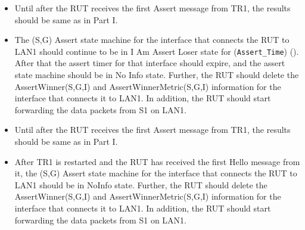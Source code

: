 \documentclass[11pt]{report}
\begin{document}

\begin{itemize}

  \item Until after the RUT receives the first Assert message from TR1, the
  results should be same as in Part I.

  \item The (S,G) Assert state machine for the interface that connects the RUT
  to LAN1 should continue to be in I Am Assert Loser state for
  (\verb=Assert_Time=) ({\PimsmAssertTime}). After that the assert timer for
  that interface should expire, and the assert state machine should be in No
  Info state.
  Further, the RUT should delete the AssertWinner(S,G,I) and
  AssertWinnerMetric(S,G,I) information for the interface that connects it to
  LAN1.
  In addition, the RUT should start forwarding the data packets from S1 on
  LAN1.

\end{itemize}


\begin{itemize}

  \item Until after the RUT receives the first Assert message from TR1, the
  results should be same as in Part I.

  \item After TR1 is restarted and the RUT has received the first Hello
  message from it, the (S,G) Assert state machine for the
  interface that connects the RUT to LAN1 should be in NoInfo state.
  Further, the RUT should delete the AssertWinner(S,G,I) and
  AssertWinnerMetric(S,G,I) information for the interface that connects it to
  LAN1.
  In addition, the RUT should start forwarding the data packets from S1 on
  LAN1.

\end{itemize}

\end{document}
